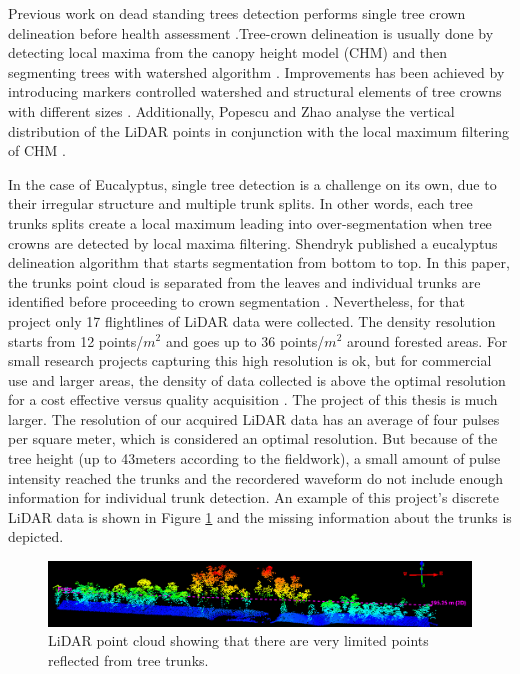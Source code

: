 \documentclass{subfiles}
\begin{document}
\par Previous work on dead standing trees detection performs single tree crown delineation before health assessment \cite{Yao2012} \cite{Shendryk2016_DeadTrees}.Tree-crown delineation is usually done by detecting local maxima from the canopy height model (CHM) and then segmenting trees with watershed algorithm \cite{Popescu2003}. Improvements has been achieved by introducing markers controlled watershed \cite{Jing2012} and structural elements of tree crowns with different sizes \cite{Hu2014}. Additionally, Popescu and Zhao analyse the vertical distribution of the LiDAR points in conjunction with the local maximum filtering of CHM \cite{Popescu2008}.


 \par  In the case of Eucalyptus, single tree detection is a challenge on its own, due to their irregular structure and multiple trunk splits. In other words, each tree trunks splits create a local maximum leading into over-segmentation when tree crowns are detected by local maxima filtering. Shendryk published a eucalyptus delineation algorithm that starts segmentation from bottom to top. In this paper, the trunks point cloud is separated from the leaves and individual trunks are identified before proceeding to crown segmentation \cite{Shendryk2016_treeDeliniation}. Nevertheless, for that project only 17 flightlines of LiDAR data were collected. The density resolution starts from 12 points/$m^2$ and goes up to 36 points/$m^2$ around forested areas. For small research projects capturing this high resolution is ok, but for commercial use and larger areas, the density of data collected is above the optimal resolution for a cost effective versus quality acquisition \cite{Lovell2005}. The project of this thesis is much larger. The resolution of our acquired LiDAR data has an average of four pulses per square meter, which is considered an optimal resolution. But because of the tree height (up to 43meters according to the fieldwork), a small amount of pulse intensity reached the trunks and the recordered waveform do not include enough information for individual trunk detection.  An example of this project's discrete LiDAR data is shown in Figure \ref{fig:NoTrunks} and the missing information about the trunks is depicted.
 
   	\begin{figure} [h!]
   		\centering
   		\includegraphics[trim={7cm 0 1.7cm 0},clip,width=\textwidth]{img/dead/TreesNoTrunks}
   		\caption{LiDAR point cloud showing that there are very limited points reflected from tree trunks.}
   		\label{fig:NoTrunks}
   	\end{figure}
   	
\end{document}
